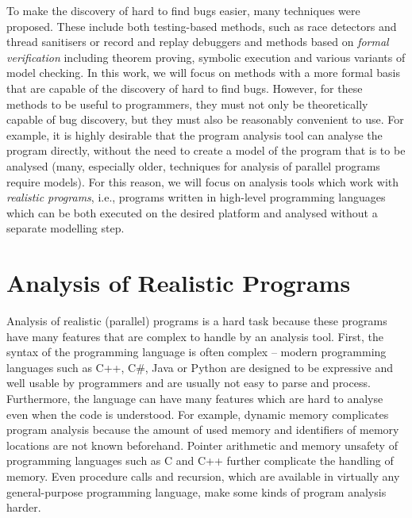 To make the discovery of hard to find bugs easier, many techniques were proposed.
These include both testing-based methods, such as race detectors and thread sanitisers or record and replay debuggers  and methods based on \emph{formal verification} including theorem proving, symbolic execution and various variants of model checking.
In this work, we will focus on methods with a more formal basis that are capable of the discovery of hard to find bugs.
However, for these methods to be useful to programmers, they must not only be theoretically capable of bug discovery, but they must also be reasonably convenient to use.
For example, it is highly desirable that the program analysis tool can analyse the program directly, without the need to create a model of the program that is to be analysed (many, especially older, techniques for analysis of parallel programs require models).
For this reason, we will focus on analysis tools which work with \emph{realistic programs}, i.e., programs written in high-level programming languages which can be both executed on the desired platform and analysed without a separate modelling step.

\section{Analysis of Realistic Programs}\label{sec:intro:programs}

Analysis of realistic (parallel) programs is a hard task because these programs have many features that are complex to handle by an analysis tool.
First, the syntax of the programming language is often complex -- modern programming languages such as C++, C\#, Java or Python are designed to be expressive and well usable by programmers and are usually not easy to parse and process.
Furthermore, the language can have many features which are hard to analyse even when the code is understood.
For example, dynamic memory complicates program analysis because the amount of used memory and identifiers of memory locations are not known beforehand.
Pointer arithmetic and memory unsafety of programming languages such as C and C++ further complicate the handling of memory.
Even procedure calls and recursion, which are available in virtually any general-purpose programming language, make some kinds of program analysis harder.

